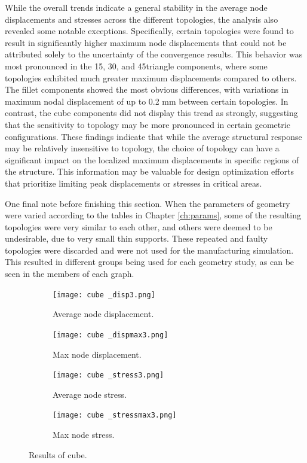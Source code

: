 \documentclass[../main.tex]{subfiles}
\begin{document}
While the overall trends indicate a general stability in the average node displacements and stresses across the different topologies, the analysis also revealed some notable exceptions. Specifically, certain topologies were found to result in significantly higher maximum node displacements that could not be attributed solely to the uncertainty of the convergence results. This behavior was most pronounced in the 15\degree, 30\degree, and 45\degree triangle components, where some topologies exhibited much greater maximum displacements compared to others. The fillet components showed the most obvious differences, with variations in maximum nodal displacement of up to 0.2 mm between certain topologies. In contrast, the cube components did not display this trend as strongly, suggesting that the sensitivity to topology may be more pronounced in certain geometric configurations. These findings indicate that while the average structural response may be relatively insensitive to topology, the choice of topology can have a significant impact on the localized maximum displacements in specific regions of the structure. This information may be valuable for design optimization efforts that prioritize limiting peak displacements or stresses in critical areas.

One final note before finishing this section. When the parameters of geometry were varied according to the tables in Chapter \ref{ch:params}, some of the resulting topologies were very similar to each other, and others were deemed to be undesirable, due to very small thin supports. These repeated and faulty topologies were discarded and were not used for the manufacturing simulation. This resulted in different groups being used for each geometry study, as can be seen in the members of each graph.

\begin{figure}[h!]
  \centering 
  \begin{subfigure}[b]{0.45\textwidth}
    \centering 
    \texttt{[image: cube \_disp3.png]}
    \caption{Average node displacement.}
    \label{}
  \end{subfigure}
  \begin{subfigure}[b]{0.45\textwidth}
    \centering 
    \texttt{[image: cube \_dispmax3.png]}
    \caption{Max node displacement.}
    \label{}
  \end{subfigure}
  \begin{subfigure}[b]{0.45\textwidth}
    \centering 
    \texttt{[image: cube \_stress3.png]}
    \caption{Average node stress.}
    \label{}
  \end{subfigure}
  \begin{subfigure}[b]{0.45\textwidth}
    \centering 
    \texttt{[image: cube \_stressmax3.png]}
    \caption{Max node stress.}
    \label{}
  \end{subfigure}
  \caption{Results of cube.}
  \label{fig:cuberesults}
\end{figure}
\end{document}
